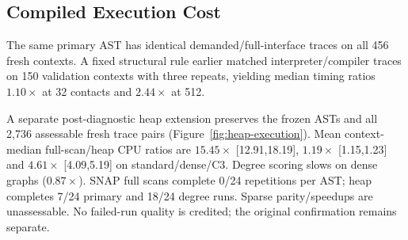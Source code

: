 \subsection{Compiled Execution Cost}
\label{sec:experiments:deployment}
The same primary AST has identical demanded/full-interface traces on all 456
fresh contexts. A fixed structural rule earlier matched interpreter/compiler
traces on 150 validation contexts with three repeats, yielding median timing
ratios $1.10\times$ at 32 contacts and $2.44\times$ at 512.

A separate post-diagnostic heap extension preserves the frozen ASTs and all
2,736 assessable fresh trace pairs (Figure~\ref{fig:heap-execution}). Mean
context-median full-scan/heap CPU ratios are $15.45\times$ [12.91,18.19],
$1.19\times$ [1.15,1.23] and $4.61\times$ [4.09,5.19] on standard/dense/C3.
Degree scoring slows on dense graphs ($0.87\times$). SNAP full scans complete
0/24 repetitions per AST; heap completes 7/24 primary and 18/24 degree runs.
Sparse parity/speedups are unassessable. No failed-run quality is credited;
the original confirmation remains separate.
